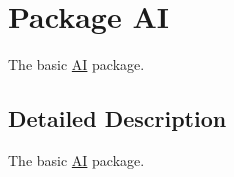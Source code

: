 \hypertarget{namespace_a_i}{
\section{Package AI}
\label{namespace_a_i}
}


The basic \hyperlink{namespace_a_i}{AI} package.  




\subsection{Detailed Description}
The basic \hyperlink{namespace_a_i}{AI} package. 